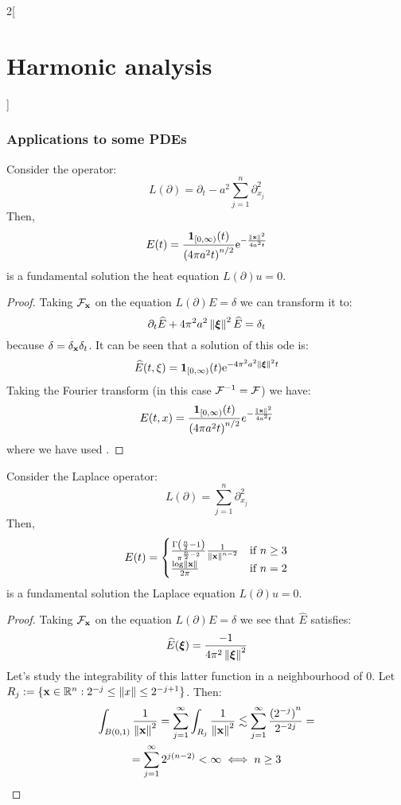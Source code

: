 \documentclass[../../../main_math.tex]{subfiles}
\begin{document}
\begin{multicols}{2}[\section{Harmonic analysis}]
  \subsubsection{Applications to some PDEs}
  \begin{proposition}\label{HA:heat}
    Consider the operator:
    $$
      L(\partial)=\partial_t-a^2\sum_{j=1}^{n}\partial_{x_j}^2
    $$
    Then, $$
      E(t)=\frac{\boldsymbol{\mathrm{1}}_{[0,\infty)}(t)}{{(4\pi a^2t)}^{n/2}}\mathrm{e}^{-\frac{\left\|\boldsymbol{\mathrm{x}}\right\|^2}{4a^2t}}
    $$
    is a fundamental solution the heat equation $L(\partial)u=0$.
  \end{proposition}
  \begin{proof}
    Taking $\mathcal{F}_{\boldsymbol{\mathrm{x}}}$ on the equation $L(\partial) E=\delta$ we can transform it to:
    $$
      \partial_t \widehat{E}+4\pi^2a^2\left\|\boldsymbol{\mathrm{\xi}}\right\|^2\widehat{E}=\delta_t
    $$
    because $\delta=\delta_{\boldsymbol{\mathrm{x}}}\delta_t$. It can be seen that a solution of this ode is:
    $$
      \widehat{E}(t,\xi)=\boldsymbol{\mathrm{1}}_{[0,\infty)}(t)\mathrm{e}^{-4\pi^2a^2\left\|\boldsymbol{\mathrm{\xi}}\right\|^2t}
    $$
    Taking the Fourier transform (in this case $\mathcal{F}^{-1}=\mathcal{F}$) we have:
    $$
      E(t,x)=\frac{\boldsymbol{\mathrm{1}}_{[0,\infty)}(t)}{{(4\pi a^2t)}^{n/2}}e^{-\frac{\left\|\boldsymbol{\mathrm{x}}\right\|^2}{4a^2t}}
    $$
    where we have used .
  \end{proof}
  \begin{proposition}
    Consider the Laplace operator:
    $$
      L(\partial)=\sum_{j=1}^{n}\partial_{x_j}^2
    $$
    Then, $$
      E(t)=\begin{cases}
        \frac{\Gamma\left(\frac{n}{2}-1\right)}{\pi^{\frac{n}{2}-2}}\frac{1}{\left\|\boldsymbol{\mathrm{x}}\right\|^{n-2}} & \text{if }n\geq 3 \\
        \frac{\log\left\|\boldsymbol{\mathrm{x}}\right\|}{2\pi}                                                            & \text{if }n=2     \\
      \end{cases}
    $$
    is a fundamental solution the Laplace equation $L(\partial)u=0$.
  \end{proposition}
  \begin{proof}
    Taking $\mathcal{F}_{\boldsymbol{\mathrm{x}}}$ on the equation $L(\partial) E=\delta$ we see that $\widehat{E}$ satisfies:
    $$
      \widehat{E}(\boldsymbol{\mathrm{\xi}}) = \frac{-1}{4\pi^2\left\|\boldsymbol{\mathrm{\xi}}\right\|^2}
    $$
    Let's study the integrability of this latter function in a neighbourhood of $0$. Let $R_j:=\{\boldsymbol{\mathrm{x}}\in\mathbb{R}^n:2^{-j}\leq \left\|x\right\|\leq 2^{-j+1}\}$. Then:
    \begin{multline*}
      \int_{B(0,1)}\frac{1}{\norm{\vf{x}}^2}=\sum_{j=1}^{\infty}\int_{R_j} \frac{1}{\norm{\vf{x}}^2}\lesssim \sum_{j=1}^{\infty}\frac{{(2^{-j})}^n}{2^{-2j}}=\\= \sum_{j=1}^{\infty}2^{j(n-2)}<\infty\iff n\geq 3

\end{multline*}
\end{proof}
\end{multicols}
\end{document}
